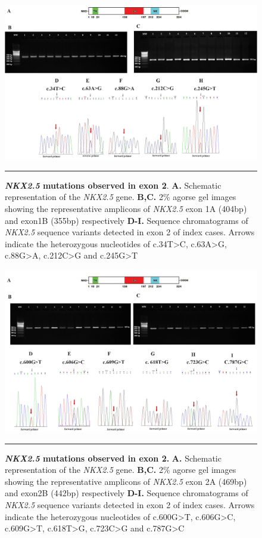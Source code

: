\begin{refsection}
\begin{figure}
\centering
\includegraphics[scale=1,keepaspectratio]{Figures/Figure5_1.pdf}
\rule{35em}{0.5pt}
\caption[\textit{NKX2.5} mutations observed in exon 2]{\textbf{\textit{NKX2.5} mutations observed in exon 2}. \textbf{A.} Schematic representation of the \textit{NKX2.5} gene. \textbf{B,C.} 2\% agorse gel images showing the representative amplicons of \textit{NKX2.5} exon 1A (404bp) and exon1B (355bp) respectively \textbf{D-I.} Sequence chromatograms of \textit{NKX2.5} sequence variants detected in exon 2 of index cases. Arrows indicate the heterozygous nucleotides of c.34T>C, c.63A>G, c.88G>A, c.212C>G and c.245G>T}
\label{fig:5_1}
\end{figure}

\begin{figure}
\centering
\includegraphics[scale=0.9,keepaspectratio]{Figures/Figure5_2.pdf}
\rule{35em}{0.5pt}
\caption[\textit{NKX2.5} mutations observed in exon 2]{\textbf{\textit{NKX2.5} mutations observed in exon 2.} \textbf{A.} Schematic representation of the \textit{NKX2.5} gene. \textbf{B,C.} 2\% agorse gel images showing the representative amplicons of \textit{NKX2.5} exon 2A (469bp) and exon2B (442bp) respectively \textbf{D-I.} Sequence chromatograms of \textit{NKX2.5} sequence variants detected in exon 2 of index cases. Arrows indicate the heterozygous nucleotides of c.600G>T, c.606G>C, c.609G>T, c.618T>G, c.723C>G and c.787G>C}
\label{fig:5_2}
\end{figure}


\end{refsection}
